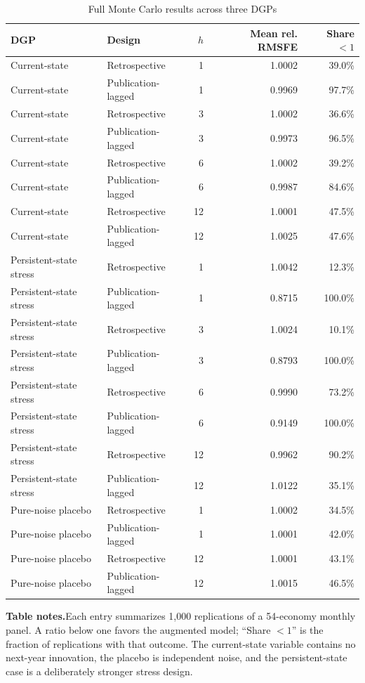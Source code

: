 \documentclass[12pt]{article}
\newcommand{\TableNote}[1]{%
  \par\vspace{0.65ex}\noindent
  \begin{minipage}{0.97\linewidth}\footnotesize\singlespacing\raggedright
  \textbf{Table notes.}\enspace #1
  \end{minipage}}
\begin{document}
\begin{table}[htbp]
\centering\scriptsize
\caption{Full Monte Carlo results across three DGPs}
\begin{tabular}{llrrr}
\toprule
DGP & Design & $h$ & Mean rel. RMSFE & Share $<1$\\
\midrule
Current-state & Retrospective & 1 & 1.0002 & 39.0\%\\
Current-state & Publication-lagged & 1 & 0.9969 & 97.7\%\\
Current-state & Retrospective & 3 & 1.0002 & 36.6\%\\
Current-state & Publication-lagged & 3 & 0.9973 & 96.5\%\\
Current-state & Retrospective & 6 & 1.0002 & 39.2\%\\
Current-state & Publication-lagged & 6 & 0.9987 & 84.6\%\\
Current-state & Retrospective & 12 & 1.0001 & 47.5\%\\
Current-state & Publication-lagged & 12 & 1.0025 & 47.6\%\\
\midrule
Persistent-state stress & Retrospective & 1 & 1.0042 & 12.3\%\\
Persistent-state stress & Publication-lagged & 1 & 0.8715 & 100.0\%\\
Persistent-state stress & Retrospective & 3 & 1.0024 & 10.1\%\\
Persistent-state stress & Publication-lagged & 3 & 0.8793 & 100.0\%\\
Persistent-state stress & Retrospective & 6 & 0.9990 & 73.2\%\\
Persistent-state stress & Publication-lagged & 6 & 0.9149 & 100.0\%\\
Persistent-state stress & Retrospective & 12 & 0.9962 & 90.2\%\\
Persistent-state stress & Publication-lagged & 12 & 1.0122 & 35.1\%\\
\midrule
Pure-noise placebo & Retrospective & 1 & 1.0002 & 34.5\%\\
Pure-noise placebo & Publication-lagged & 1 & 1.0001 & 42.0\%\\
Pure-noise placebo & Retrospective & 12 & 1.0001 & 43.1\%\\
Pure-noise placebo & Publication-lagged & 12 & 1.0015 & 46.5\%\\
\bottomrule
\end{tabular}
\TableNote{Each entry summarizes 1,000 replications of a 54-economy monthly panel. A ratio below one favors the augmented model; ``Share $<1$'' is the fraction of replications with that outcome. The current-state variable contains no next-year innovation, the placebo is independent noise, and the persistent-state case is a deliberately stronger stress design.}
\end{table}
\end{document}
